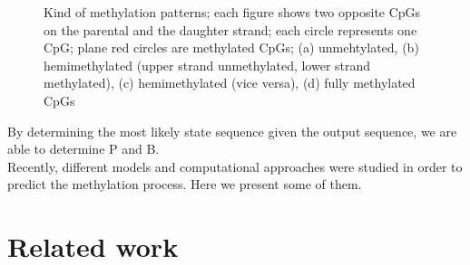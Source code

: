 \begin{figure}
\begin{subfigure}{.5\textwidth}
\centering
{}
\caption{}
\label{fig:sfig0}
\end{subfigure}%
\begin{subfigure}{.5\textwidth}
\centering
{}
  \caption{}
  \label{fig:sfig1}
\end{subfigure}
\begin{subfigure}{.5\textwidth}
\centering
{}
  \caption{}
  \label{fig:sfig2}
\end{subfigure}
\begin{subfigure}{.5\textwidth}
\centering
{}
  \caption{}
  \label{fig:sfig3}
\end{subfigure}
\caption{Kind of methylation patterns; each figure shows two opposite CpGs on the parental and the daughter strand; each circle represents one CpG; plane red circles are methylated CpGs; (a) unmehtylated, (b) hemimethylated (upper strand unmethylated, lower strand methylated), (c) hemimethylated (vice versa), (d) fully methylated CpGs}
\label{fig:fig}
\end{figure}
By determining the most likely state sequence given the output sequence, we are able to determine P and B.\\

Recently, different models and computational approaches were studied in order to predict the methylation process. Here we present some of them.\\

\section{Related work} 
\label{section:RelWork} 